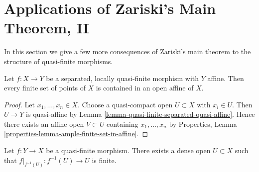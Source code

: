 \section{Applications of Zariski's Main Theorem, II}
\label{section-applications-zmt-II}

\noindent
In this section we give a few more consequences of Zariski's main theorem
to the structure of quasi-finite morphisms.

\begin{lemma}
\label{lemma-separated-locally-quasi-finite-over-affine}
Let $f : X \to Y$ be a separated, locally quasi-finite morphism
with $Y$ affine. Then every finite set of points of $X$ is contained
in an open affine of $X$.
\end{lemma}

\begin{proof}
Let $x_1, \ldots, x_n \in X$. Choose a quasi-compact open
$U \subset X$ with $x_i \in U$. Then $U \to Y$ is quasi-affine by
Lemma \ref{lemma-quasi-finite-separated-quasi-affine}.
Hence there exists an affine open $V \subset U$ containing
$x_1, \ldots, x_n$ by
Properties, Lemma \ref{properties-lemma-ample-finite-set-in-affine}.
\end{proof}

\begin{lemma}
\label{lemma-quasi-finite-finite-over-dense-open}
Let $f : Y \to X$ be a quasi-finite morphism.
There exists a dense open $U \subset X$ such that
$f|_{f^{-1}(U)} : f^{-1}(U) \to U$ is finite.
\end{lemma}

